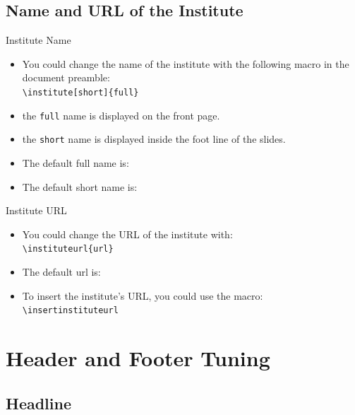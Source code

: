 \documentclass[english,sectioncirclenumberstyle]{ciadbeamer}
\begin{document}
\subsection{Name and URL of the Institute}

\begin{frame}{Institute Name}
	\begin{itemize}
	\item You could change the name of the institute with the following macro in the document preamble: \\
		\texttt{{\textbackslash}institute[short]\{full\}}
	\item the \texttt{full} name is displayed on the front page.
	\item the \texttt{short} name is displayed inside the foot line of the slides.
	\vspace{1em}
	\item The default full name is: \\
		{\smaller\insertinstitute}
	\item The default short name is: \insertshortinstitute
	\end{itemize}
\end{frame}

\begin{frame}{Institute URL}
	\begin{itemize}
	\item You could change the URL of the institute with: \\
		\texttt{{\textbackslash}instituteurl\{url\}}
	\vspace{1em}
	\item The default url is: \insertinstituteurl
	\vspace{1em}
	\item To insert the institute's URL, you could use the macro: \\
			\texttt{{\textbackslash}insertinstituteurl}
	\end{itemize}
\end{frame}

\section{Header and Footer Tuning}
\sectiontableofcontentslide

\subsection{Headline}
\end{document}
